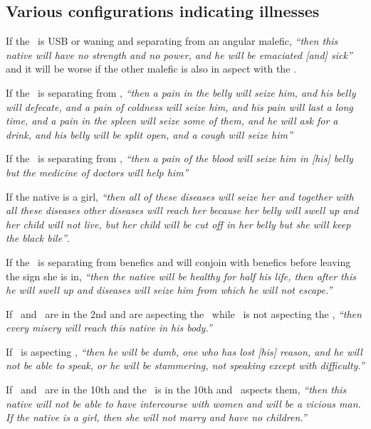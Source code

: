 \subsection{Various configurations indicating illnesses}

If  the \Moon\, is USB or waning and separating from an angular malefic, \textsl{``then this native will have no strength and no power, and he will be emaciated [and] sick''} and it will be worse if the other malefic is also in aspect with the \Moon.

If  the \Moon\, is separating from \Saturn, \textsl{``then a pain in the belly will seize him, and his belly will defecate, and a pain of coldness will seize him, and his pain will last a long time, and a pain in the spleen will seize some of them, and he will ask for a drink, and his belly will be split open, and a cough will seize him''} 

If  the \Moon\, is separating from \Mars, \textsl{``then a pain of the blood will seize him in [his] belly but the medicine of doctors will help him''}

If  the native is a girl, \textsl{``then all of these diseases will seize her and together with all these diseases other diseases will reach her because her belly will swell up and her child will not live, but her child will be cut off in her belly but she will keep the black bile''}.

If  the \Moon\, is separating from benefics and will conjoin with benefics before leaving the sign she is in, \textsl{``then the native will be healthy for half his life, then after this he will swell up and diseases will seize him from which he will not escape.''}

If  \Saturn\, and \Mars\, are in the 2nd and are aspecting the \Moon\, while \Jupiter\, is not aspecting the \Moon, \textsl{``then every misery will reach this native in his body.''}

If  \Saturn\, is aspecting \Mercury, \textsl{``then he will be dumb, one who has lost [his] reason, and he will not be able to speak, or he will be stammering, not speaking except with difficulty.''}

If  \Saturn\, and \Venus\, are in the 10th and the \Moon\, is in the 10th and \Mars\, aspects them, \textsl{``then this native will not be able to have intercourse with women and will be a vicious man. If the native is a girl, then she will not marry and have no children.''}

